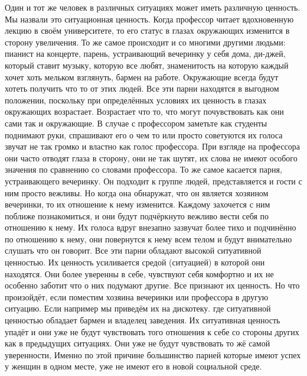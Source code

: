 Один и тот же человек в различных ситуациях может иметь различную ценность. Мы назвали это ситуационная ценность. Когда профессор читает вдохновенную лекцию в своём университете, то его статус в глазах окружающих изменится в сторону увеличения. То же самое происходит и со многими другими людьми: пианист на концерте, парень, устраивающий вечеринку у себя дома, ди-джей, который ставит музыку, которую все любят, знаменитость на которую каждый хочет хоть мельком взглянуть, бармен на работе. Окружающие всегда будут хотеть получить что то от этих людей. Все эти парни находятся в выгодном положении, поскольку при определённых условиях их ценность в глазах окружающих возрастает. Возрастает что то, что могут почувствовать как они сами так и окружающие. В случае с профессором заметьте как студенты поднимают руки, спрашивают его о чем то или просто советуются их голоса звучат не так громко и властно как голос профессора. При взгляде на профессора они часто отводят глаза в сторону, они не так шутят, их слова не имеют особого значения по сравнению со словами профессора. То же самое касается парня, устраивающего вечеринку. Он подходит к группе людей, представляется и гости с ним просто вежливы. Но когда она обнаружат, что он является хозяином вечеринки, то их отношение к нему изменится. Каждому захочется с ним поближе познакомиться, и они будут подчёркнуто вежливо вести себя по отношению к нему. Их голоса вдруг внезапно зазвучат более тихо и подчинённо по отношению к нему, они повернутся к нему всем телом и будут внимательно слушать что он говорит. Все эти парни обладают высокой ситуативной ценностью. Их ценность усиливается средой (ситуацией) в которой они находятся. Они более уверенны в себе, чувствуют себя комфортно и их не особенно заботит что о них подумают другие. Все признают их ценность. Но что произойдёт, если поместим хозяина вечеринки или профессора в другую ситуацию. Если например мы приведём их на дискотеку. где ситуативной ценностью обладает бармен и владелец заведения. Их ситуативная ценность упадёт и они уже не будут чувствовать того отношения к себе со стороны других как в предыдущих ситуациях. Они уже не будут чувствовать то жё самой уверенности, Именно по этой причине большинство парней которые имеют успех у женщин в одном месте, уже не имеют его в новой социальной среде.

